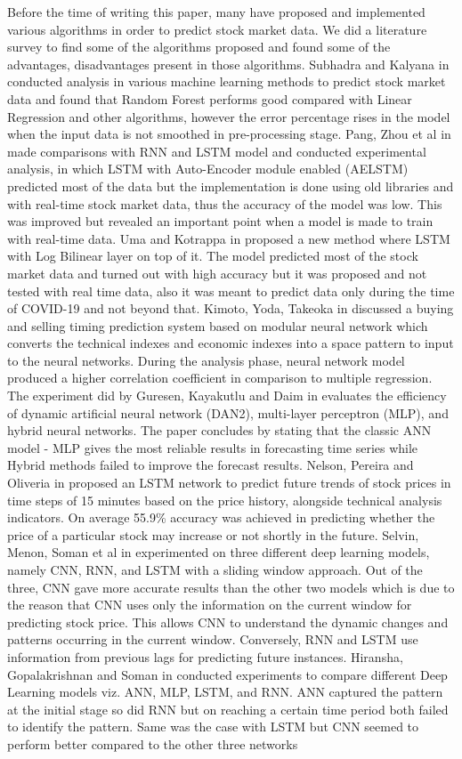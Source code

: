 \documentclass[conference]{IEEEtran}
\begin{document}
Before the time of writing this paper, many have proposed and implemented various algorithms in order to predict stock market data. We did a literature survey to find some of the algorithms proposed and found some of the advantages, disadvantages present in those algorithms. Subhadra and Kalyana in \cite{b1} conducted analysis in various machine learning methods to predict stock market data and found that Random Forest performs good compared with Linear Regression and other algorithms, however the error percentage rises in the model when the input data is not smoothed in pre-processing stage. Pang, Zhou et al in \cite{b2} made comparisons with RNN and LSTM model and conducted experimental analysis, in which LSTM with Auto-Encoder module enabled (AELSTM) predicted most of the data but the implementation is done using old libraries and with real-time stock market data, thus the accuracy of the model was low. This was improved but revealed an important point when a model is made to train with real-time data. Uma and Kotrappa in \cite{b3} proposed a new method where LSTM with Log Bilinear layer on top of it. The model predicted most of the stock market data and turned out with high accuracy but it was proposed and not tested with real time data, also it was meant to predict data only during the time of COVID-19 and not beyond that. Kimoto, Yoda, Takeoka in \cite{b4} discussed a buying and selling timing prediction system based on modular neural network which converts the technical indexes and economic indexes into a space pattern to input to the neural networks. During the analysis phase, neural network model produced a higher correlation coefficient in comparison to multiple regression. The experiment did by Guresen, Kayakutlu and Daim in \cite{b5} evaluates the efficiency of dynamic artificial neural network (DAN2), multi-layer perceptron (MLP), and hybrid neural networks. The paper concludes by stating that the classic ANN model - MLP gives the most reliable results in forecasting time series while Hybrid methods failed to improve the forecast results. Nelson, Pereira and Oliveria in \cite{b6} proposed an LSTM network to predict future trends of stock prices in time steps of 15 minutes based on the price history, alongside technical analysis indicators. On average  55.9\% accuracy was achieved in predicting whether the price of a particular stock may increase or not shortly in the future. Selvin, Menon, Soman et al in \cite{b7} experimented on three different deep learning models, namely CNN, RNN, and LSTM with a sliding window approach. Out of the three, CNN gave more accurate results than the other two models which is due to the reason that CNN uses only the information on the current window for predicting stock price. This allows CNN  to understand the dynamic changes and patterns occurring in the current window. Conversely, RNN and LSTM use information from previous lags for predicting future instances. Hiransha, Gopalakrishnan and Soman in \cite{b8} conducted experiments to compare different Deep Learning models viz. ANN, MLP, LSTM, and RNN. ANN captured the pattern at the initial stage so did RNN but on reaching a certain time period both failed to identify the pattern. Same was the case with LSTM but CNN seemed to perform better compared to the other three networks 
\end{document}
